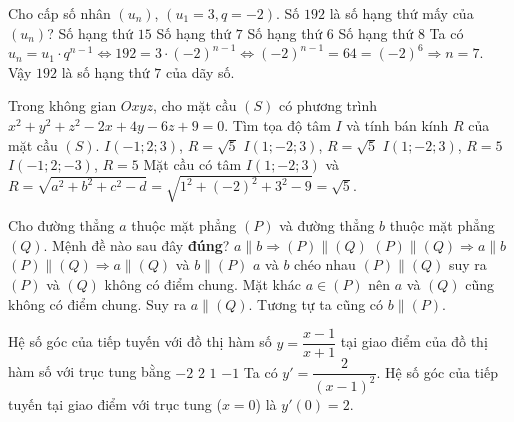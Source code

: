 \begin{ex}%
	Cho cấp số nhân $\left(u_n\right)$, $\left(u_1=3,q=-2\right)$. Số $192$ là số hạng thứ mấy của $\left(u_n\right)$?	
	\choice
	{Số hạng thứ $15$}
	{\True Số hạng thứ $7$}
	{Số hạng thứ $6$}
	{Số hạng thứ $8$}
	\loigiai
	{
		Ta có $u_n=u_1\cdot q^{n-1}\Leftrightarrow 192 = 3\cdot (-2)^{n-1}\Leftrightarrow (-2)^{n-1}=64=(-2)^6\Rightarrow n=7$.\\
		Vậy $192$ là số hạng thứ $7$ của dãy số.
	}
\end{ex} 

\begin{ex}%
	Trong không gian $Oxyz$, cho mặt cầu $(S)$ có phương trình $x^2+y^2+z^2-2x+4y-6z+9=0$. Tìm tọa độ tâm $I$ và tính bán kính $R$ của mặt cầu $(S)$.
	\choice
	{$I(-1;2;3)$, $R=\sqrt{5}$}
	{\True $I(1;-2;3)$, $R=\sqrt{5}$}
	{$I(1;-2;3)$, $R=5$}
	{$I(-1;2;-3)$, $R=5$}
	\loigiai
	{
		Mặt cầu có tâm $I(1;-2;3)$ và $R=\sqrt{a^2+b^2+c^2-d}=\sqrt{1^2+(-2)^2+3^2-9}=\sqrt{5}$.
	}
\end{ex} 

\begin{ex}%
	Cho đường thẳng $a$ thuộc mặt phẳng $(P)$ và đường thẳng $b$ thuộc mặt phẳng $(Q)$. Mệnh đề nào sau đây \textbf{đúng}?
	\choice
	{$a\parallel b\Rightarrow (P)\parallel (Q)$}
	{$(P)\parallel (Q)\Rightarrow a\parallel b$}
	{\True $(P)\parallel (Q)\Rightarrow a\parallel (Q)$ và $b\parallel (P)$}
	{$a$ và $b$ chéo nhau}
	\loigiai
	{
		$(P)\parallel (Q)$ suy ra $(P)$ và $(Q)$ không có điểm chung. Mặt khác $a\in (P)$ nên $a$ và $(Q)$ cũng không có điểm chung. Suy ra $a\parallel (Q)$. Tương tự ta cũng có $b\parallel (P)$.
	}
\end{ex} 

\begin{ex}%
	Hệ số góc của tiếp tuyến với đồ thị hàm số $y=\dfrac{x-1}{x+1}$ tại giao điểm của đồ thị hàm số với trục tung bằng	
	\choice
	{$-2$}
	{\True $2$}
	{$1$}
	{$-1$}
	\loigiai
	{
		Ta có $y'=\dfrac{2}{(x-1)^2}$. Hệ số góc của tiếp tuyến tại giao điểm với trục tung ($x=0$) là $y'(0)=2$.
	}
\end{ex} 

